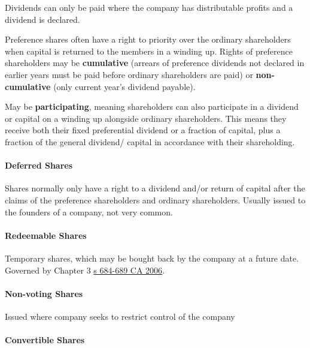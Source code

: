 \documentclass[
]{article}
\begin{document}
Dividends can only be paid where the company has distributable profits
and a dividend is declared.

Preference shares often have a right to priority over the ordinary
shareholders when capital is returned to the members in a winding up.
Rights of preference shareholders may be \textbf{cumulative} (arrears of
preference dividends not declared in earlier years must be paid before
ordinary shareholders are paid) or \textbf{non-cumulative} (only current
year's dividend payable).

May be \textbf{participating}, meaning shareholders can also participate
in a dividend or capital on a winding up alongside ordinary
shareholders. This means they receive both their fixed preferential
dividend or a fraction of capital, plus a fraction of the general
dividend/ capital in accordance with their shareholding.

\hypertarget{deferred-shares}{%
\paragraph{Deferred Shares}\label{deferred-shares}}

Shares normally only have a right to a dividend and/or return of capital
after the claims of the preference shareholders and ordinary
shareholders. Usually issued to the founders of a company, not very
common.

\hypertarget{redeemable-shares}{%
\paragraph{Redeemable Shares}\label{redeemable-shares}}

Temporary shares, which may be bought back by the company at a future
date. Governed by Chapter 3
\href{https://www.legislation.gov.uk/ukpga/2006/46/section/684}{s
684-689 CA 2006}.

\hypertarget{non-voting-shares}{%
\paragraph{Non-voting Shares}\label{non-voting-shares}}

Issued where company seeks to restrict control of the company

\hypertarget{convertible-shares}{%
\paragraph{Convertible Shares}\label{convertible-shares}}
\end{document}

